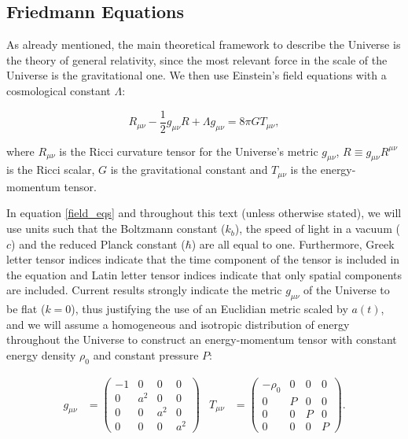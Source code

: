 \documentclass[openany,a4paper,12pt,oneside]{book}
\begin{document}
\begin{spacing}{1.5}
\subsection{Friedmann Equations}

As already mentioned, the main theoretical framework to describe the Universe is the theory of general relativity, since the most relevant force in the scale of the Universe is the gravitational one. We then use Einstein's field equations with a cosmological constant $\Lambda$:

\begin{equation}\label{field_eqs}
    R_{\mu\nu}-\frac{1}{2}g_{\mu\nu}R+\Lambda g_{\mu\nu}=8\pi GT_{\mu\nu},
\end{equation}

\noindent where $R_{\mu\nu}$ is the Ricci curvature tensor for the Universe's metric $g_{\mu\nu}$, $R\equiv g_{\mu\nu} R^{\mu\nu}$ is the Ricci scalar, $G$ is the gravitational constant and $T_{\mu\nu}$ is the energy-momentum tensor. 

In equation \eqref{field_eqs} and throughout this text (unless otherwise stated), we will use units such that the Boltzmann constant ($k_b$), the speed of light in a vacuum ($c$) and the reduced Planck constant ($\hbar$) are all equal to one. Furthermore, Greek letter tensor indices indicate that the time component of the tensor is included in the equation and Latin letter tensor indices indicate that only spatial components are included. Current results strongly indicate the metric $g_{\mu\nu}$ of the Universe to be flat ($k=0$)\cite{Planck_results}, thus justifying the use of an Euclidian metric scaled by $a(t)$, and we will assume a homogeneous and isotropic distribution of energy throughout the Universe to construct an energy-momentum tensor with constant energy density $\rho_0$ and constant pressure $P$\cite{dodelson2020modern}:

\begin{align}\label{cap2:initial_tensors}
    g_{\mu\nu}&=
    \begin{pmatrix}
        -1 & 0 & 0 & 0\\
        0 & a^2 & 0 & 0\\
        0 & 0 & a^2 & 0\\
        0 & 0 & 0 & a^2
    \end{pmatrix} &
    T_{\mu\nu}&=
    \begin{pmatrix}
        -\rho_0 & 0 & 0 & 0 \\
        0 & P & 0 & 0 \\
        0 & 0 & P & 0 \\
        0 & 0 & 0 & P
    \end{pmatrix}.
\end{align}


\end{spacing}
\end{document}
